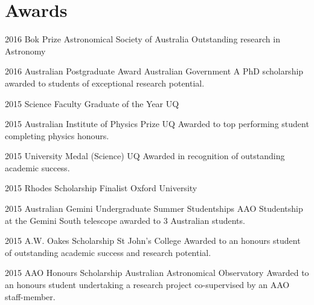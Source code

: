 \documentclass[]{friggeri-cv} %
\begin{document}


\section{Awards}

\begin{entrylist}
	\entryInline
	{2016}
	{Bok Prize}
	{Astronomical Society of Australia}
	{Outstanding research in Astronomy}
\end{entrylist}
\begin{entrylist}
	\entryInlineSmall
	{2016}
	{Australian Postgraduate Award}
	{Australian Government}
	{A PhD scholarship awarded to students of exceptional research potential.}
\end{entrylist}
\begin{entrylist}
	\entryInlineSmall
	{2015}
	{Science Faculty Graduate of the Year}
	{UQ}
	{}
\end{entrylist}
\begin{entrylist}
	\entryInlineSmall
	{2015}
	{Australian Institute of Physics Prize}
	{UQ}
	{Awarded to top performing student completing physics honours.}
\end{entrylist}
\begin{entrylist}
	\entryInlineSmall
	{2015}
	{University Medal (Science)}
	{UQ}
	{Awarded in recognition of outstanding academic success.}
\end{entrylist}
\begin{entrylist}
	\entryInlineSmall
	{2015}
	{Rhodes Scholarship Finalist}
	{Oxford University}
	{}
\end{entrylist}
\begin{entrylist}
	\entryInlineSmall
	{2015}
	{Australian Gemini Undergraduate Summer Studentships}
	{AAO}
	{Studentship at the Gemini South telescope awarded to 3 Australian students.}
\end{entrylist}
\begin{entrylist}
	\entryInlineSmall
	{2015}
	{A.W. Oakes Scholarship}
	{St John's College}
	{Awarded to an honours student of outstanding academic success and research potential.}
\end{entrylist}
\begin{entrylist}
	\entryInlineSmall
	{2015}
	{AAO Honours Scholarship}
	{Australian Astronomical Observatory}
	{Awarded to an honours student undertaking a research project co-supervised by an AAO staff-member.}
\end{entrylist}
\end{document}
